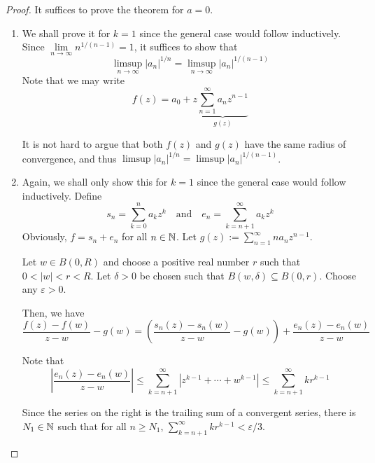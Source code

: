 \begin{proof}
It suffices to prove the theorem for $a = 0$.
\begin{enumerate}[label = (\alph*)]
    \item We shall prove it for $k = 1$ since the general case would follow inductively. Since $\lim\limits_{n\to\infty}n^{1/(n - 1)} = 1$, it suffices to show that 
    \begin{equation*}
        \limsup_{n\to\infty} |a_n|^{1/n} = \limsup_{n\to\infty}|a_n|^{1/(n - 1)}
    \end{equation*}
    Note that we may write 
    \begin{equation*}
        f(z) = a_0 + z\underbrace{\sum_{n = 1}^\infty a_nz^{n - 1}}_{g(z)}
    \end{equation*}

    It is not hard to argue that both $f(z)$ and $g(z)$ have the same radius of convergence, and thus $\limsup |a_n|^{1/n} = \limsup |a_n|^{1/(n - 1)}$.

    \item Again, we shall only show this for $k = 1$ since the general case would follow inductively. Define 
    \begin{equation*}
        s_n = \sum_{k = 0}^n a_kz^k\quad\text{and}\quad e_n = \sum_{k = n + 1}^\infty a_kz^k
    \end{equation*}
    Obviously, $f = s_n + e_n$ for all $n\in\mathbb{N}$. Let $g(z) := \sum\limits_{n = 1}^\infty na_nz^{n - 1}$.

    Let $w\in B(0,R)$ and choose a positive real number $r$ such that $0 < |w| < r < R$. Let $\delta > 0$ be chosen such that $B(w, \delta)\subseteq B(0,r)$. Choose any $\varepsilon > 0$.

    Then, we have 
    \begin{equation*}
        \frac{f(z) - f(w)}{z - w} - g(w) = \left(\frac{s_n(z) - s_n(w)}{z - w} - g(w)\right)+ \frac{e_n(z) - e_n(w)}{z - w}
    \end{equation*}

    Note that 
    \begin{equation*}
        \left|\frac{e_n(z) - e_n(w)}{z - w}\right|\le\sum_{k = n + 1}^\infty |z^{k - 1} + \cdots + w^{k - 1}|\le\sum_{k = n + 1}^\infty kr^{k - 1}
    \end{equation*}

    Since the series on the right is the trailing sum of a convergent series, there is $N_1\in\mathbb{N}$ such that for all $n\ge N_1$, $\sum\limits_{k = n + 1}^\infty kr^{k - 1} < \varepsilon/3$. 


\end{enumerate}
\end{proof}
